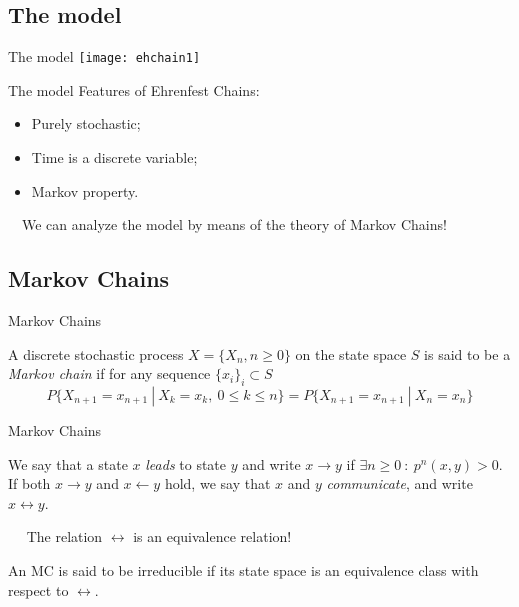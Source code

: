\documentclass[xcolor=x11names, compress]{beamer}
\renewcommand{\(}{\begin{columns}}
\renewcommand{\)}{\end{columns}}
\newcommand{\<}[1]{\begin{column}{#1}}
\renewcommand{\>}{\end{column}}
\theoremstyle{definition}
\theoremstyle{plain}
\begin{document}
\subsection{The model}
\begin{frame}{The model}
\texttt{[image: ehchain1]}
\end{frame}

\begin{frame}{The model}
\large{Features of Ehrenfest Chains:\\}
\begin{itemize}
\item Purely stochastic;
\item Time is a discrete variable;
\item Markov property.
\end{itemize}
$\quad$\newline We can analyze the model by means of the theory of Markov Chains!
\end{frame}

\subsection{Markov Chains}
\begin{frame}{Markov Chains}
\begin{definition}
	A discrete stochastic process $X = \{X_n, n\geq 0\}$ on the state space $S$ is said to be a \emph{Markov chain} if for any sequence $\{x_i\}_i\subset S$
	\[
	P\{X_{n+1}=x_{n+1}\ |\ X_k = x_k,\ 0 \leq k \leq n\} = P\{X_{n+1}=x_{n+1}\ |\ X_n = x_n\}
	\]
\end{definition}
\end{frame}

\begin{frame}{Markov Chains}
\begin{definition}
We say that a state $x$ \emph{leads} to state $y$ and write $x\longrightarrow y$ if $\exists n\geq 0\ :\ p^n(x,y) > 0$. If both $x\longrightarrow y$ and $x\longleftarrow y$ hold, we say that $x$ and $y$ \emph{communicate}, and write $x\longleftrightarrow y$.
\end{definition}
$\quad$\newline
The relation $\longleftrightarrow$ is an equivalence relation!
$\quad$\newline
{\begin{definition}[Irreducibility]
An MC is said to be irreducible if its state space is an equivalence class with respect to $\longleftrightarrow$.
\end{definition}}
\end{frame}
\end{document}
